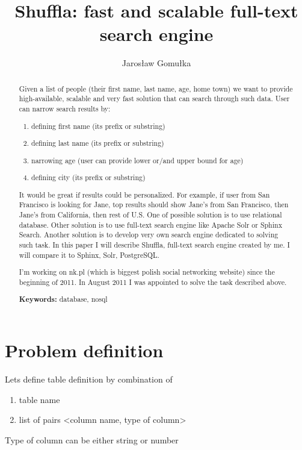 \documentclass[10pt,a4paper]{article}
\begin{document}
\title{Shuffla: fast and scalable full-text search engine}
\author{Jarosław Gomułka}

\maketitle

\begin{abstract}
Given a list of people (their first name, last name, age, home town) we want to provide high-available, scalable and very fast solution that can search through such data.
User can narrow search results by:

\bigskip
\begin{enumerate}
\item{defining first name (its prefix or substring)}
\item{defining last name (its prefix or substring)}
\item{narrowing age (user can provide lower or/and upper bound for age)}
\item{defining city (its prefix or substring)}
\end{enumerate}

\bigskip
It would be great if results could be personalized. For example, if user from San Francisco is looking for Jane, top results should show Jane's from San Francisco, then Jane's from California, then rest of U.S. One of possible solution is to use relational database. Other solution is to use full-text search engine like Apache Solr or Sphinx Search. Another solution is to develop very own search engine dedicated to solving such task. In this paper I will describe Shuffla, full-text search engine created by me. I will compare it to Sphinx, Solr, PostgreSQL. 

\bigskip
I'm working on nk.pl (which is biggest polish social networking website) since the beginning of 2011. In August 2011 I was appointed to solve the task described above. 

\bigskip
\noindent \textbf{Keywords:} database, nosql
\end{abstract}


\section{Problem definition}

Lets define table definition by combination of
\begin{enumerate}
\item table name
\item list of pairs <column name, type of column>
\end{enumerate}
Type of column can be either string or number
\end{document}
